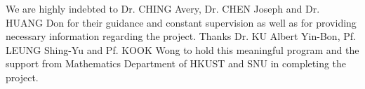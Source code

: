 We are  highly indebted to Dr. CHING Avery, Dr. CHEN Joseph and Dr. HUANG Don for their guidance and constant supervision as well as for providing necessary information regarding the project. Thanks Dr. KU Albert Yin-Bon, Pf. LEUNG Shing-Yu and Pf. KOOK Wong to hold this meaningful program and the support from Mathematics Department of HKUST and SNU in completing the project.


